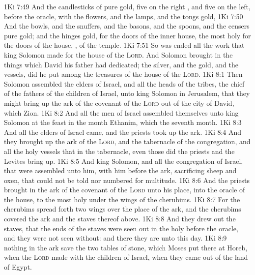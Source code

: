 \vs 1Ki 7:49 And the candlesticks of pure gold, five on the right , and five on the left, before the oracle, with the flowers, and the lamps, and the tongs  gold,
\vs 1Ki 7:50 And the bowls, and the snuffers, and the basons, and the spoons, and the censers  pure gold; and the hinges  gold,  for the doors of the inner house, the most holy  for the doors of the house, , of the temple.
\vs 1Ki 7:51 So was ended all the work that king Solomon made for the house of the \textsc{Lord}. And Solomon brought in the things which David his father had dedicated;  the silver, and the gold, and the vessels, did he put among the treasures of the house of the \textsc{Lord}.
\vs 1Ki 8:1 Then Solomon assembled the elders of Israel, and all the heads of the tribes, the chief of the fathers of the children of Israel, unto king Solomon in Jerusalem, that they might bring up the ark of the covenant of the \textsc{Lord} out of the city of David, which  Zion.
\vs 1Ki 8:2 And all the men of Israel assembled themselves unto king Solomon at the feast in the month Ethanim, which  the seventh month.
\vs 1Ki 8:3 And all the elders of Israel came, and the priests took up the ark.
\vs 1Ki 8:4 And they brought up the ark of the \textsc{Lord}, and the tabernacle of the congregation, and all the holy vessels that  in the tabernacle, even those did the priests and the Levites bring up.
\vs 1Ki 8:5 And king Solomon, and all the congregation of Israel, that were assembled unto him,  with him before the ark, sacrificing sheep and oxen, that could not be told nor numbered for multitude.
\vs 1Ki 8:6 And the priests brought in the ark of the covenant of the \textsc{Lord} unto his place, into the oracle of the house, to the most holy  under the wings of the cherubims.
\vs 1Ki 8:7 For the cherubims spread forth  two wings over the place of the ark, and the cherubims covered the ark and the staves thereof above.
\vs 1Ki 8:8 And they drew out the staves, that the ends of the staves were seen out in the holy  before the oracle, and they were not seen without: and there they are unto this day.
\vs 1Ki 8:9  nothing in the ark save the two tables of stone, which Moses put there at Horeb, when the \textsc{Lord} made  with the children of Israel, when they came out of the land of Egypt.
